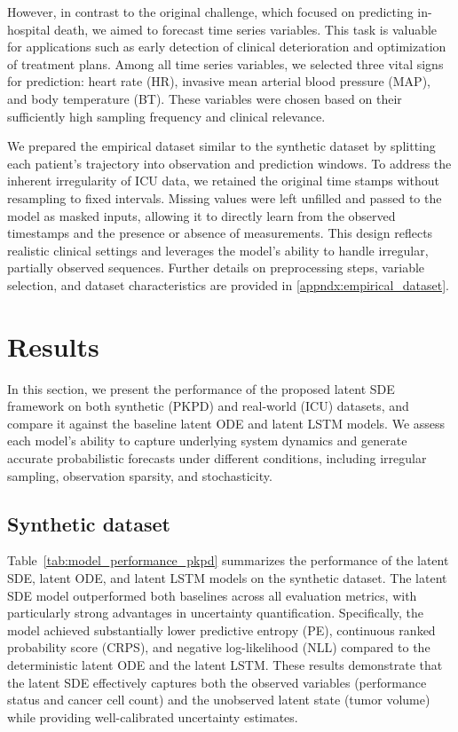 \documentclass[preprint,12pt]{elsarticle}
\begin{document}
However, in contrast to the original challenge, which focused on predicting in-hospital death, we aimed to forecast time series variables. This task is valuable for applications such as early detection of clinical deterioration and optimization of treatment plans. Among all time series variables,  we selected three vital signs for prediction: heart rate (HR), invasive mean arterial blood pressure (MAP), and body temperature (BT). These variables were chosen based on their sufficiently high sampling frequency and clinical relevance.

We prepared the empirical dataset similar to the synthetic dataset by splitting each patient's trajectory into observation and prediction windows. To address the inherent irregularity of ICU data, we retained the original time stamps without resampling to fixed intervals. Missing values were left unfilled and passed to the model as masked inputs, allowing it to directly learn from the observed timestamps and the presence or absence of measurements. This design reflects realistic clinical settings and leverages the model’s ability to handle irregular, partially observed sequences. Further details on preprocessing steps, variable selection, and dataset characteristics are provided in \ref{appndx:empirical_dataset}.

\section{Results}
In this section, we present the performance of the proposed latent SDE framework on both synthetic (PKPD) and real-world (ICU) datasets, and compare it against the baseline latent ODE and latent LSTM models. We assess each model's ability to capture underlying system dynamics and generate accurate probabilistic forecasts under different conditions, including irregular sampling, observation sparsity, and stochasticity.

\subsection{Synthetic dataset}
Table~\ref{tab:model_performance_pkpd} summarizes the performance of the latent SDE, latent ODE, and latent LSTM models on the synthetic dataset. The latent SDE model outperformed both baselines across all evaluation metrics, with particularly strong advantages in uncertainty quantification. Specifically, the model achieved substantially lower predictive entropy (PE), continuous ranked probability score (CRPS), and negative log-likelihood (NLL) compared to the deterministic latent ODE and the latent LSTM. These results demonstrate that the latent SDE effectively captures both the observed variables (performance status and cancer cell count) and the unobserved latent state (tumor volume) while providing well-calibrated uncertainty estimates.
\end{document}

